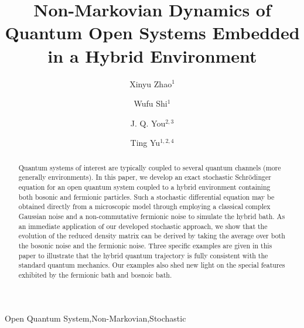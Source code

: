 \documentclass[preprint]{elsarticle}
\begin{document}
\begin{frontmatter}

\title{Non-Markovian Dynamics of  Quantum Open Systems Embedded in a Hybrid Environment}

\author{Xinyu Zhao$^{1}$}
\author{Wufu Shi$^{1}$}
\author{J. Q. You$^{2,3}$}
\author{Ting Yu$^{1,2,4}$}
\address{$^{1}$Department of Physics
and Engineering Physics, Stevens Institute of Technology, Hoboken,
New Jersey 07030, USA}
\address{$^{2}$Beijing Computational Science Research Center, Beijing 100094, China}
\address{$^{3}$Synergetic Innovation Center of Quantum Information and Quantum Physics, University of Science and Technology of China, Hefei, Anhui 230026, China}
\address{$^{4}$School of Physics and Optoelectronic Engineering, Yangtze University, Jingzhou 434023, China}




\begin{abstract}
Quantum systems of interest are typically coupled to several quantum channels (more generally  environments). 
 In this paper, we develop an exact stochastic Schr\"{o}dinger equation 
for an open  quantum system coupled to a hybrid environment containing both bosonic and fermionic 
particles.  Such a stochastic differential equation may be obtained directly from a microscopic model
through  employing  a classical complex Gaussian noise  and a non-commutative fermionic noise to simulate
the hybrid bath. 
As an immediate application of our developed stochastic approach, we show that the evolution of the reduced
density matrix can be derived by taking the average over both the bosonic noise and the fermionic noise.
Three specific examples are given in this paper to illustrate that the hybrid quantum trajectory 
is fully consistent with the standard quantum mechanics. Our examples also shed new light on the special features 
exhibited by the fermionic bath and bosnoic bath.
\end{abstract}

\begin{keyword}
Open Quantum System\sep Non-Markovian\sep Stochastic
\end{keyword}

\end{frontmatter}
\end{document}
